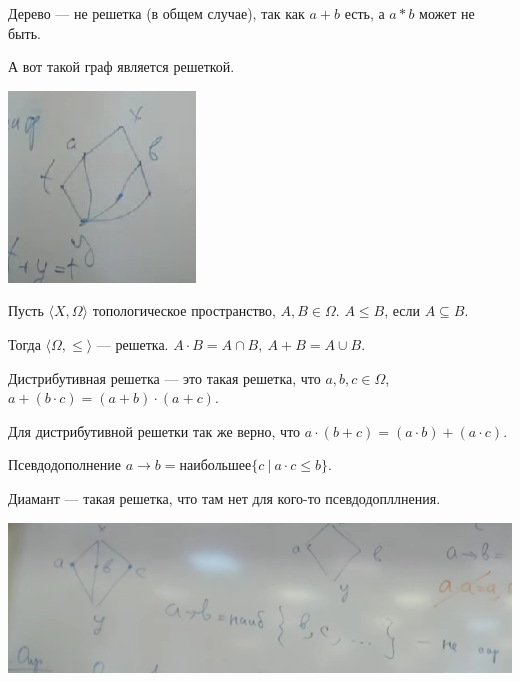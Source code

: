 \begin{example}
    Дерево --- не решетка (в общем случае), так как $a + b$ есть, а $a*b$ может не быть.

    А вот такой граф является решеткой.

    \includegraphics[scale=1]{img/grid_graph.png}
\end{example}

\begin{theorem}
    Пусть $\langle X, \Omega \rangle$ топологическое пространство, $A, B \in \Omega$. $A \leqslant B$, если $A \subseteq B$.

    Тогда $\langle \Omega, \leqslant\rangle$ --- решетка. $A \cdot B = A \cap B, ~ A + B = A \cup B$.
\end{theorem}

\begin{definition}
    Дистрибутивная решетка --- это такая решетка, что $a,b,c \in \Omega$, ~$a + (b \cdot c) = (a + b) \cdot (a + c)$.
\end{definition}

\begin{lemma}
    Для дистрибутивной решетки так же верно, что $a \cdot (b + c) = (a \cdot b) + (a \cdot c)$.
\end{lemma}

\begin{definition}
    Псевдодополнение $a \to b = \text{наибольшее} \{ c ~|~ a \cdot c \leqslant b\}$.
\end{definition}

\begin{definition}
    Диамант --- такая решетка, что там нет для кого-то псевдодопллнения.

    \begin{center}
        \includegraphics[scale=0.8]{img/topology_diomant}
    \end{center}
\end{definition}

